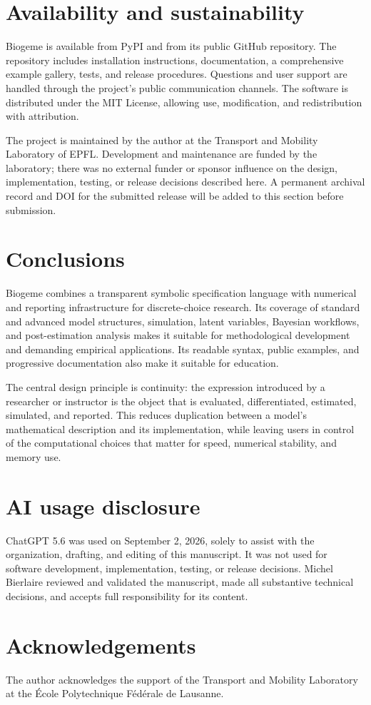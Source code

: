 \documentclass[11pt]{article}
\begin{document}
\section{Availability and sustainability}

Biogeme is available from PyPI and from its public GitHub repository. The
repository includes installation instructions, documentation, a comprehensive
example gallery, tests, and release procedures. Questions and user support are
handled through the project's public communication channels. The software is
distributed under the MIT License, allowing use, modification, and
redistribution with attribution.

The project is maintained by the author at the Transport and Mobility
Laboratory of EPFL. Development and maintenance are funded by the laboratory;
there was no external funder or sponsor influence on the design, implementation,
testing, or release decisions described here. A permanent archival record and
DOI for the submitted release will be added to this section before submission.

\section{Conclusions}

Biogeme combines a transparent symbolic specification language with numerical
and reporting infrastructure for discrete-choice research. Its coverage of
standard and advanced model structures, simulation, latent variables, Bayesian
workflows, and post-estimation analysis makes it suitable for methodological
development and demanding empirical applications. Its readable syntax, public
examples, and progressive documentation also make it suitable for education.

The central design principle is continuity: the expression introduced by a
researcher or instructor is the object that is evaluated, differentiated,
estimated, simulated, and reported. This reduces duplication between a model's
mathematical description and its implementation, while leaving users in control
of the computational choices that matter for speed, numerical stability, and
memory use.

\section*{AI usage disclosure}

ChatGPT 5.6 was used on September 2, 2026, solely to assist with the
organization, drafting, and editing of this manuscript. It was not used for
software development, implementation, testing, or release decisions. Michel
Bierlaire reviewed and validated the manuscript, made all substantive technical
decisions, and accepts full responsibility for its content.

\section*{Acknowledgements}

The author acknowledges the support of the Transport and Mobility Laboratory at
the École Polytechnique Fédérale de Lausanne.



\end{document}
